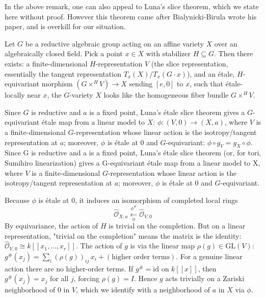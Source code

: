 \documentclass[12pt]{article}
\begin{document}
\begin{remark}
    In the above remark, one can also appeal to Luna's slice theorem, which we state here without proof. However this theorem came after Bialynicki-Birula wrote his paper, and is overkill for our situation.
\begin{theorem}
    Let $G$ be a reductive algebraic group acting on an affine variety $X$ over an algebraically closed field. Pick a point $x \in X$ with stabilizer $H \subseteq G$. Then there exists: a finite-dimensional $H$-representation $V$ (the slice representation, essentially the tangent representation $T_x(X)/T_x(G\cdot x)$), and an étale, $H$-equivariant morphism $(G \times^H V) \longrightarrow X$ sending $[e,0]$ to $x$, such that étale-locally near $x$, the $G$-variety $X$ looks like the homogeneous fiber bundle $G \times^H V$.
\end{theorem}
Since $G$ is reductive and $a$ is a fixed point, Luna's étale slice theorem gives a $G$-equivariant étale map from a linear model to $X$: $\phi:(V,0)\longrightarrow (X,a)$, where $V$ is a finite-dimensional $G$-representation whose linear action is the isotropy/tangent representation at $a$; moreover, $\phi$ is étale at $0$ and $G$-equivariant: $\phi\circ g_V = g_X\circ \phi$.
Since G is reductive and a is a fixed point, Luna’s étale slice theorem (or, for tori, Sumihiro linearization) gives a G-equivariant étale map from a linear model to X, where $V$ is a finite-dimensional $G$-representation whose linear action is the isotropy/tangent representation at $a$; moreover, $\phi$ is étale at $0$ and $G$-equivariant.

Because $\phi$ is étale at $0$, it induces an isomorphism of completed local rings \[\widehat{\mathcal O}_{X,a}\xleftarrow[\cong]{\phi^\#} \widehat{\mathcal O}_{V,0}\] By equivariance, the action of $H$ is trivial on the completion. But on a linear representation, "trivial on the completion" means the matrix is the identity: $\widehat{\mathcal O}_{V,0}\cong k[[x_1,\dots,x_r]]$. The action of $g$ is via the linear map $\rho(g)\in \mathrm{GL}(V)$: $g^{\#}(x_j) = \sum_i (\rho(g))_{ij}\,x_i + (\text{higher order terms})$. For a genuine linear action there are no higher-order terms. If $g^\#=\mathrm{id}$ on $k[[x]]$, then $g^\#(x_j)=x_j$ for all $j$, forcing $\rho(g)=I$. Hence $g$ acts trivially on a Zariski neighborhood of $0$ in $V$, which we identify with a neighborhood of $a$ in $X$ via $\phi$.
\end{remark}
\end{document}
